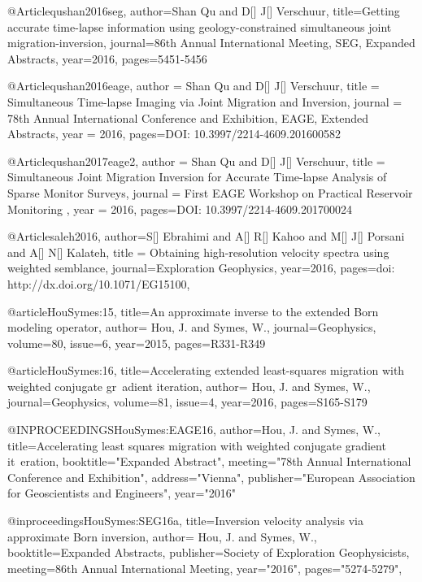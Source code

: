 @Article{qushan2016seg,
  author={Shan Qu and D[] J[] Verschuur},
  title={Getting accurate time-lapse information using geology-constrained simultaneous joint migration-inversion},
  journal={86th Annual International Meeting, SEG, Expanded Abstracts},
  year=2016,
  pages={5451-5456}
}


@Article{qushan2016eage,
  author = 	 {Shan Qu and D[] J[] Verschuur},
  title = 	 {Simultaneous Time-lapse Imaging via Joint Migration and Inversion},
  journal = 	 { 78th Annual International Conference and Exhibition, EAGE, Extended Abstracts},
  year = 	 2016,
  pages={DOI: 10.3997/2214-4609.201600582}}
  

@Article{qushan2017eage2,
  author = 	 {Shan Qu and D[] J[] Verschuur},
  title = 	 {Simultaneous Joint Migration Inversion for Accurate Time-lapse Analysis of Sparse Monitor Surveys},
  journal = 	 { First EAGE Workshop on Practical Reservoir Monitoring },
  year = 	 2016,
  pages={DOI: 10.3997/2214-4609.201700024}}
  
  

@Article{saleh2016,
  author={S[] Ebrahimi and A[] R[] Kahoo and M[] J[] Porsani and A[] N[] Kalateh},
  title = {Obtaining high-resolution velocity spectra using weighted semblance},
  journal={Exploration Geophysics},
  year=2016,
  pages={doi: http://dx.doi.org/10.1071/EG15100},
}

@article{HouSymes:15,
title={An approximate inverse to the extended {B}orn modeling operator},
author= {Hou, J. and Symes, W.},
journal={Geophysics},
volume={80},
issue={6},
year={2015},
pages={R331-R349}
}

@article{HouSymes:16,
title={Accelerating extended least-squares migration with weighted conjugate gr\
adient iteration},
author= {Hou, J. and Symes, W.},
journal={Geophysics},
volume={81},
issue={4},
year={2016},
pages={S165-S179}
}

@INPROCEEDINGS{HouSymes:EAGE16,
author={Hou, J. and Symes, W.},
title={Accelerating least squares migration with weighted conjugate gradient it\
eration},
booktitle="Expanded Abstract",
meeting="78th Annual International Conference and Exhibition",
address="Vienna",
publisher="European Association for Geoscientists and Engineers",
year="2016"}

@inproceedings{HouSymes:SEG16a,
title={Inversion velocity analysis via approximate Born inversion},
author= {Hou, J. and Symes, W.},
booktitle={Expanded Abstracts},
publisher={Society of Exploration Geophysicists},
meeting={86th Annual International Meeting},
year="2016",
pages="5274-5279",
}

